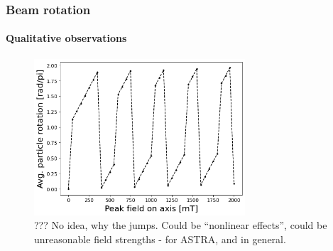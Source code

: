 \documentclass{beamer}
\begin{document}
\begin{frame}
  \frametitle{Beam rotation}
  \framesubtitle{Qualitative observations}
  \begin{figure}
    \includegraphics[width=0.7\textwidth]{wtf}
    \caption{??? No idea, why the jumps. Could be \textquotedblleft nonlinear effects\textquotedblright, could be unreasonable field strengths - for ASTRA, and in general.}
  \end{figure}
\end{frame}



\end{document}
